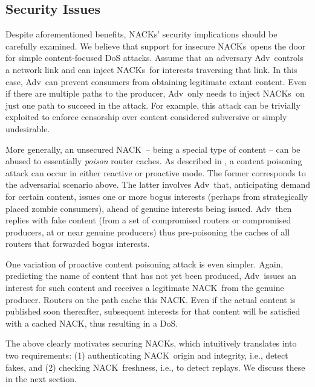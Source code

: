 \documentclass[conference]{IEEEtran}
\newcommand{\Adv}{Adv}
\newcommand{\cnack}{\mbox{\sf {\cal c}NACK}}
\newcommand{\cnacks}{\mbox{\sf {\cal c}NACK}s}
\begin{document}
\subsection{Security Issues}
Despite aforementioned benefits, \cnacks' security implications 
should be carefully examined. We believe that support for insecure \cnacks\ 
opens the door for simple content-focused DoS attacks. 
Assume that an adversary \Adv\ controls a network link 
and can inject \cnacks\ for interests traversing that link. In this case, \Adv\ 
can prevent consumers from obtaining legitimate extant content. Even if there are 
multiple paths to the producer, \Adv\ only needs to inject \cnacks\
on just one path to succeed in the attack. For example, this attack can be trivially
exploited to enforce censorship over content considered subversive or
simply undesirable. 

More generally,  an unsecured \cnack\ -- being a special type of content -- can be abused
to essentially {\em poison} router caches. As described in \cite{gasti2013and}, a content
poisoning attack can occur in either reactive or proactive mode. The former corresponds
to the adversarial scenario above. The latter involves \Adv\ that, anticipating demand for
certain content, issues one or more bogus interests (perhaps from strategically placed zombie
consumers), ahead of genuine interests being issued. \Adv\ then replies with fake content
(from a set of compromised routers or compromised producers, at or near
genuine producers) thus pre-poisoning the caches of all routers that forwarded bogus interests.  

One variation of proactive content poisoning attack is even simpler. Again, predicting 
the name of content that has not yet been produced, \Adv\ issues an interest for such 
content and receives a legitimate \cnack\ from the genuine producer. Routers on the path
cache this \cnack. Even if the actual content is published soon thereafter, subsequent 
interests for that content will be satisfied with a cached \cnack, thus resulting in a DoS.


The above clearly motivates securing \cnacks, which intuitively 
translates into two requirements: (1) authenticating \cnack\ origin and integrity, i.e., detect fakes, 
and (2) checking \cnack\ freshness, i.e., to detect replays. We discuss these in the next section.
\end{document}
